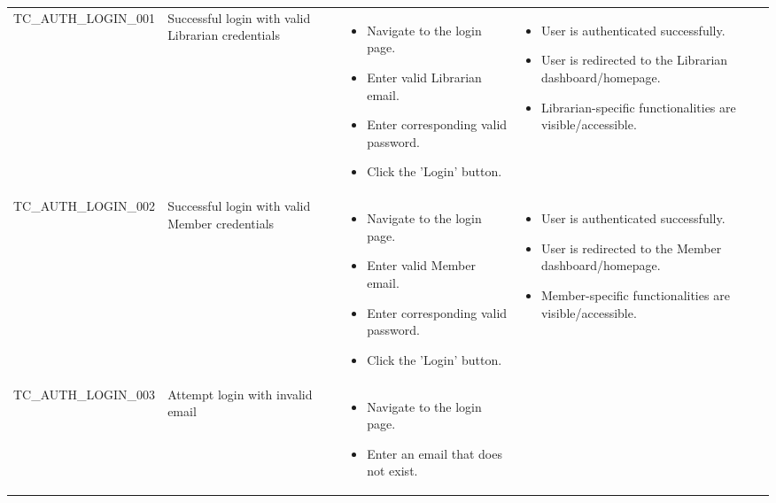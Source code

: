 \begin{longtable}{|>{\scriptsize\raggedright\arraybackslash}p{3.5cm}|>{\raggedright\arraybackslash}p{3.5cm}|>{\raggedright\arraybackslash}p{4cm}|>{\raggedright\arraybackslash}p{4cm}|}
\multicolumn{4}{|l|}{\textbf{Sub-Section: User Login}} \\ \hline
TC\_AUTH\_LOGIN\_001 & Successful login with valid Librarian credentials & 
    \begin{itemize}[noitemsep, topsep=0pt, partopsep=0pt, leftmargin=*]
        \item Navigate to the login page.
        \item Enter valid Librarian email. 
        \item Enter corresponding valid password. 
        \item Click the 'Login' button.
    \end{itemize} & 
    \begin{itemize}[noitemsep, topsep=0pt, partopsep=0pt, leftmargin=*]
        \item User is authenticated successfully.
        \item User is redirected to the Librarian dashboard/homepage.
        \item Librarian-specific functionalities are visible/accessible.
    \end{itemize} \\ \hline
TC\_AUTH\_LOGIN\_002 & Successful login with valid Member credentials & 
    \begin{itemize}[noitemsep, topsep=0pt, partopsep=0pt, leftmargin=*]
        \item Navigate to the login page.
        \item Enter valid Member email. 
        \item Enter corresponding valid password. 
        \item Click the 'Login' button.
    \end{itemize} & 
    \begin{itemize}[noitemsep, topsep=0pt, partopsep=0pt, leftmargin=*]
        \item User is authenticated successfully.
        \item User is redirected to the Member dashboard/homepage.
        \item Member-specific functionalities are visible/accessible.
    \end{itemize} \\ \hline
TC\_AUTH\_LOGIN\_003 & Attempt login with invalid email & 
    \begin{itemize}[noitemsep, topsep=0pt, partopsep=0pt, leftmargin=*]
        \item Navigate to the login page.
        \item Enter an email that does not exist. 

\end{itemize}
\end{longtable}
